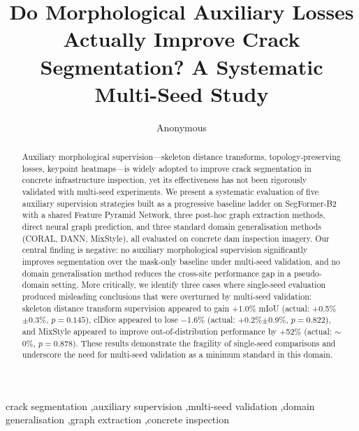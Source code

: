 \documentclass[preprint,12pt]{elsarticle}
\begin{document}
\begin{frontmatter}

\title{Do Morphological Auxiliary Losses Actually Improve Crack Segmentation? A Systematic Multi-Seed Study}

\author[anon]{Anonymous}
\address[anon]{Removed for double-blind review}

\begin{abstract}
Auxiliary morphological supervision---skeleton distance transforms, topology-preserving losses, keypoint heatmaps---is widely adopted to improve crack segmentation in concrete infrastructure inspection, yet its effectiveness has not been rigorously validated with multi-seed experiments. We present a systematic evaluation of five auxiliary supervision strategies built as a progressive baseline ladder on SegFormer-B2 with a shared Feature Pyramid Network, three post-hoc graph extraction methods, direct neural graph prediction, and three standard domain generalisation methods (CORAL, DANN, MixStyle), all evaluated on concrete dam inspection imagery. Our central finding is negative: no auxiliary morphological supervision significantly improves segmentation over the mask-only baseline under multi-seed validation, and no domain generalisation method reduces the cross-site performance gap in a pseudo-domain setting. More critically, we identify three cases where single-seed evaluation produced misleading conclusions that were overturned by multi-seed validation: skeleton distance transform supervision appeared to gain +1.0\% mIoU (actual: +0.5\%$\pm$0.3\%, $p{=}0.145$), clDice appeared to lose $-$1.6\% (actual: +0.2\%$\pm$0.9\%, $p{=}0.822$), and MixStyle appeared to improve out-of-distribution performance by +52\% (actual: ${\sim}$0\%, $p{=}0.878$). These results demonstrate the fragility of single-seed comparisons and underscore the need for multi-seed validation as a minimum standard in this domain.
\end{abstract}

\begin{keyword}
crack segmentation \sep auxiliary supervision \sep multi-seed validation \sep domain generalisation \sep graph extraction \sep concrete inspection
\end{keyword}

\end{frontmatter}


\end{document}

